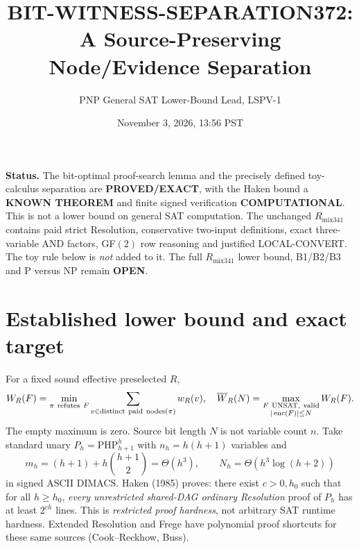 \documentclass[11pt]{article}
\title{BIT-WITNESS-SEPARATION372: A Source-Preserving Node/Evidence Separation}
\author{PNP General SAT Lower-Bound Lead, LSPV-1}
\date{November 3, 2026, 13:56 PST}
\begin{document}
\maketitle
\noindent\textbf{Status.} The bit-optimal proof-search lemma and the precisely
defined toy-calculus separation are \textbf{PROVED/EXACT}, with the
Haken bound a \textbf{KNOWN THEOREM} and finite signed verification
\textbf{COMPUTATIONAL}. This is not a lower bound on general SAT
computation. The unchanged $R_{\mathrm{mix341}}$ contains paid
strict Resolution, conservative two-input definitions, exact
three-variable AND factors, GF$(2)$ row reasoning and justified
LOCAL-CONVERT. The toy rule below is \emph{not} added to it.
The full $R_{\mathrm{mix341}}$ lower bound, B1/B2/B3 and P versus NP
remain \textbf{OPEN}.

\section*{Established lower bound and exact target}
For a fixed sound effective preselected $R$,
\[
 W_R(F)=\min_{\pi\ {\rm refutes}\ F}
       \sum_{v\in{\rm distinct\ paid\ nodes}(\pi)}w_R(v),\quad
 \overline W_R(N)=\max_{\substack{F\ {\rm UNSAT,\ valid}\\
                   |\operatorname{enc}(F)|\le N}}W_R(F).
\]
The empty maximum is zero. Source bit length $N$ is not variable
count $n$. Take standard unary
$P_h=\mathrm{PHP}_{h+1}^h$ with $n_h=h(h+1)$ variables and
\[
 m_h=(h+1)+h\binom{h+1}{2}=\Theta(h^3),\qquad
 N_h=\Theta(h^3\log(h+2))
\]
in signed ASCII DIMACS. Haken (1985) proves: there exist $c>0,h_0$
such that for all $h\ge h_0$, \emph{every unrestricted shared-DAG
ordinary Resolution} proof of $P_h$ has at least $2^{ch}$ lines.
This is \emph{restricted proof hardness}, not arbitrary SAT runtime
hardness. Extended Resolution and Frege have polynomial proof
shortcuts for these same sources (Cook--Reckhow, Buss).
\end{document}
